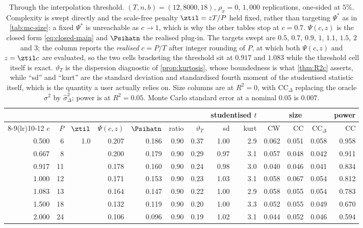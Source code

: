 \begin{table}[htbp]
\centering
\caption{Through the interpolation threshold. $(T,n,b)=(12,8000,18)$, $\rho_x=0$, $1{,}000$ replications, one-sided at $5\%$. Complexity is swept directly and the scale-free penalty $\ztil=zT/P$ held fixed, rather than targeting $\Psi^*$ as in \cref{tab:mc-size}: a fixed $\Psi^*$ is unreachable as $c\to1$, which is why the other tables stop at $c=0.7$. $\Psi(c,z)$ is the closed form \eqref{eq:closed-main} and $\Psihatn$ the realised plug-in. The targets swept are $0.5$, $0.7$, $0.9$, $1$, $1.1$, $1.5$, $2$ and $3$; the column reports the \emph{realised} $c=P/T$ after integer rounding of $P$, at which both $\Psi(c,z)$ and $z=\ztil c$ are evaluated, so the two cells bracketing the threshold sit at $0.917$ and $1.083$ while the threshold cell itself is exact. $\vartheta_T$ is the dispersion diagnostic of \cref{prop:kurtosis}, whose boundedness is what \cref{thm:R2c} asserts, while ``sd'' and ``kurt'' are the standard deviation and standardised fourth moment of the studentised statistic itself, which is the quantity a user actually relies on. Size columns are at $R^2=0$, with CC$_\Delta$ replacing the oracle $\sigma^2$ by $\hat\sigma^2_\Delta$; power is at $R^2=0.05$. Monte Carlo standard error at a nominal $0.05$ is $0.007$.}
\label{tab:mc-complexity}
\small
\begin{tabular}{rrrrrrrrrrrrr}
\toprule
& & & & & & & \multicolumn{2}{c}{studentised $t$} & \multicolumn{3}{c}{size} & power \\
\cmidrule(lr){8-9}\cmidrule(lr){10-12}
$c$ & $P$ & $\ztil$ & $\Psi(c,z)$ & $\Psihatn$ & ratio & $\vartheta_T$ & sd & kurt & CW & CC & CC$_\Delta$ & CC \\
\midrule
0.500 & 6 & 1.0 & 0.207 & 0.186 & 0.90 & 0.37 & 1.00 & 2.9 & 0.062 & 0.051 & 0.058 & 0.958 \\
0.667 & 8 &  & 0.200 & 0.179 & 0.90 & 0.29 & 0.97 & 3.1 & 0.057 & 0.048 & 0.042 & 0.911 \\
0.917 & 11 &  & 0.178 & 0.160 & 0.90 & 0.24 & 0.98 & 3.0 & 0.040 & 0.046 & 0.041 & 0.834 \\
1.000 & 12 &  & 0.171 & 0.153 & 0.90 & 0.23 & 1.03 & 3.1 & 0.058 & 0.067 & 0.054 & 0.812 \\
1.083 & 13 &  & 0.164 & 0.147 & 0.90 & 0.22 & 1.00 & 2.9 & 0.058 & 0.055 & 0.054 & 0.783 \\
1.500 & 18 &  & 0.132 & 0.119 & 0.90 & 0.20 & 1.00 & 3.3 & 0.052 & 0.055 & 0.049 & 0.670 \\
2.000 & 24 &  & 0.106 & 0.096 & 0.90 & 0.19 & 1.02 & 3.1 & 0.044 & 0.052 & 0.046 & 0.594 \\

\end{tabular}
\end{table}
